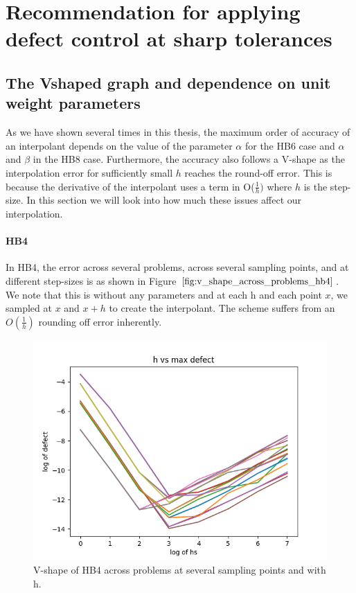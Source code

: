 \section{Recommendation for applying defect control at sharp tolerances}
\label{section:HBs_higher_tol}
\subsection{The Vshaped graph and dependence on unit weight parameters}
\label{section:v_shaped_graph}
As we have shown several times in this thesis, the maximum order of accuracy of an interpolant depends on the value of the parameter $\alpha$ for the HB6 case and $\alpha$ and $\beta$ in the HB8 case. Furthermore, the accuracy also follows a V-shape as the interpolation error for sufficiently small $h$ reaches the round-off error. This is because the derivative of the interpolant uses a term in O($\frac{1}{h})$ where $h$ is the step-size. In this section we will look into how much these issues affect our interpolation. 

\paragraph{HB4}
In HB4, the error across several problems, across several sampling points, and at different step-sizes is as shown in Figure $\ref{fig:v_shape_across_problems_hb4}$. We note that this is without any parameters and at each h and each point $x$, we sampled at $x$ and $x + h$ to create the interpolant. The scheme suffers from an $O(\frac{1}{h})$ rounding off error inherently.
\begin{figure}[H]
\centering
\includegraphics[width=0.7\linewidth]{./figures/v_shape_across_problems_hb4}
\caption{V-shape of HB4 across problems at several sampling points and with h.}
\label{fig:v_shape_across_problems_hb4}
\end{figure}

